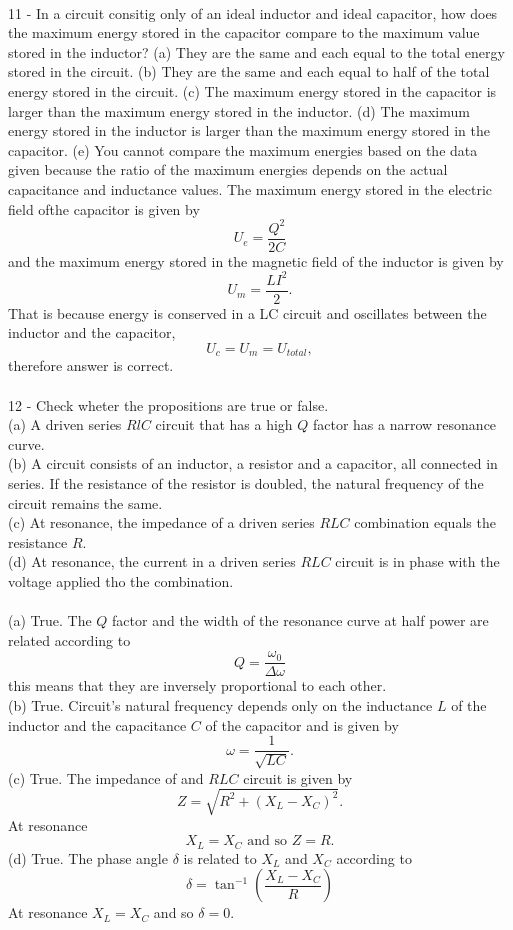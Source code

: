\documentclass{report}
\begin{document}
\paragraph{}
11 - In a circuit consitig only of an ideal inductor and ideal capacitor, how does the maximum energy stored in the capacitor compare to the maximum value stored in the inductor? (a) They are the same and each equal to the total energy stored in the circuit. (b) They are the same and each equal to half of the total energy stored in the circuit. (c) The maximum energy stored in the capacitor is larger than the maximum energy stored in the inductor. (d) The maximum energy stored in the inductor is larger than the maximum energy stored in the capacitor. (e) You cannot compare the maximum energies based on the data given because the ratio of the maximum energies depends on the actual capacitance and inductance values.
The maximum energy stored in the electric field ofthe capacitor is given by
$$U_e = \frac{Q^2}{2C}$$
and the maximum energy stored in the magnetic field of the inductor is given by
$$U_m = \frac{LI^2}{2}.$$
That is because energy is conserved in a LC circuit and oscillates between the inductor and the capacitor,
$$U_c = U_m = U_{total},$$
therefore answer  is correct.

\paragraph{}
12 - Check wheter the propositions are true or false.\\
(a) A driven series $RlC$ circuit that has a high $Q$ factor has a narrow resonance curve.\\
(b) A circuit consists of an inductor, a resistor and a capacitor, all connected in series. If the resistance of the resistor is doubled, the natural frequency of the circuit remains the same.\\
(c) At resonance, the impedance of a driven series $RLC$ combination equals the resistance $R$.\\
(d) At resonance, the current in a driven series $RLC$ circuit is in phase with the voltage applied tho the combination.\\
\\
(a) True. The $Q$ factor and the width of the resonance curve at half power are related according to
$$Q = \frac{\omega_0}{\Delta \omega}$$
this means that they are inversely proportional to each other.\\
(b) True. Circuit's natural frequency depends only on the inductance $L$ of the inductor and the capacitance $C$ of the capacitor and is given by
$$\omega = \frac{1}{\sqrt{LC}}.$$
(c) True. The impedance of and $RLC$ circuit is given by
$$Z = \sqrt{R^2 + (X_L - X_C)^2}.$$
At resonance
$$X_L = X_C \text{ and so } Z = R.$$
(d) True. The phase angle $\delta$ is related to $X_L$ and $X_C$ according to
$$\delta = \tan^{-1} \left( \frac{X_L - X_C}{R} \right)$$
At resonance $X_L = X_C$ and so $\delta = 0.$
\end{document}

